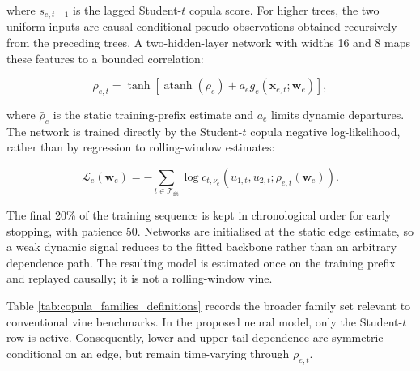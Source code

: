 where $s_{e,t-1}$ is the lagged Student-$t$ copula score. For higher trees, the two uniform inputs are causal conditional pseudo-observations obtained recursively from the preceding trees. A two-hidden-layer network with widths 16 and 8 maps these features to a bounded correlation:

\begin{equation}
\rho_{e,t}=\tanh\!\left[\operatorname{atanh}(\bar\rho_e)+a_e
g_e(\boldsymbol x_{e,t};\boldsymbol w_e)\right],
\label{eq:nn_parameter}
\end{equation}

where $\bar\rho_e$ is the static training-prefix estimate and $a_e$ limits dynamic departures. The network is trained directly by the Student-$t$ copula negative log-likelihood, rather than by regression to rolling-window estimates:

\begin{equation}
\mathcal{L}_{e}(\boldsymbol w_e)=-\sum_{t\in\mathcal T_{\mathrm{fit}}}
\log c_{t,\nu_e}\!\left(u_{1,t},u_{2,t};\rho_{e,t}(\boldsymbol w_e)\right).
\label{eq:nn_objective}
\end{equation}

The final 20\% of the training sequence is kept in chronological order for early stopping, with patience 50. Networks are initialised at the static edge estimate, so a weak dynamic signal reduces to the fitted backbone rather than an arbitrary dependence path. The resulting model is estimated once on the training prefix and replayed causally; it is not a rolling-window vine.

Table \ref{tab:copula_families_definitions} records the broader family set relevant to conventional vine benchmarks. In the proposed neural model, only the Student-$t$ row is active. Consequently, lower and upper tail dependence are symmetric conditional on an edge, but remain time-varying through $\rho_{e,t}$.

